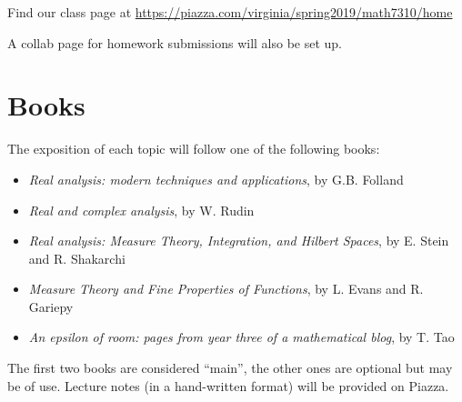 \documentclass[oneside,11pt]{amsart}
\begin{document}
Find our class page at \url{https://piazza.com/virginia/spring2019/math7310/home}

A collab page for homework submissions will also be set up.

\section{Books}

The exposition of each topic will follow one
of the following books:
\begin{itemize}
	\item \emph{Real analysis: modern techniques and applications}, by G.B. Folland
	\item \emph{Real and complex analysis}, by W. Rudin
	\item \emph{Real analysis: Measure Theory, Integration, and Hilbert Spaces},
		by E. Stein and R. Shakarchi
	\item \emph{Measure Theory and Fine Properties of Functions},
		by L. Evans and R. Gariepy
	\item \emph{An epsilon of room: pages from year three of a mathematical blog},
		by T. Tao
\end{itemize}
The first two books are considered ``main'', 
the other ones are optional but may be of use.
Lecture notes (in a hand-written format)
will be provided on Piazza. 
\end{document}
